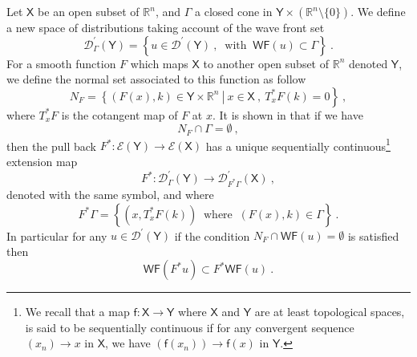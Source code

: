 \documentclass[11pt]{book}
\newcommand{\WF}{\mathsf{WF}}
\newcommand{\Dcal}{\mathcal{D}}
\newcommand{\Ecal}{\mathcal{E}}
\newcommand{\Rbb}{\mathbb{R}}
\newcommand{\Xsf}{\mathsf{X}}
\newcommand{\Ysf}{\mathsf{Y}}
\newcommand{\fsf}{\mathsf{f}}
\theoremstyle{break}
\begin{document}
Let $\Xsf$ be an open subset of $\Rbb^n$, and $\Gamma$ a closed cone in $\Ysf \times\left(\Rbb^n\setminus\{0\}\right)$. We define a new space of distributions taking account of the wave front set
%
\begin{equation*}
\Dcal^\prime_\Gamma(\Ysf) = \left\{ u \in \Dcal^\prime(\Ysf) \ , \ \mbox{ with } \ \WF(u) \subset \Gamma \right\} \ . 
\end{equation*}
%
For a smooth function $F$ which maps $\Xsf$ to another open subset of $\Rbb^n$ denoted $\Ysf$, we define the normal set associated to this function as follow
%
\begin{equation*}
N_F = \left. \left\{ (F(x),k) \in \Ysf \times \Rbb^n \ \right| \ x \in \Xsf \ , \ T^\ast_xF(k) = 0 \right\} \ , 
\end{equation*}
%
where $T^\ast_xF$ is the cotangent map of $F$ at $x$. It is shown in \cite[theorem 8.2.4]{HORMANDER_1990} that if we have
%
\begin{equation}
N_F \cap \Gamma = \emptyset \ , 
\label{eq:cond_pullback_wf}
\end{equation}
%
then the pull back $F^\ast : \Ecal(\Ysf) \to \Ecal(\Xsf)$ has a unique sequentially continuous\footnote{We recall that a map $\fsf : \Xsf \to \Ysf$ where $\Xsf$ and $\Ysf$ are at least topological spaces, is said to be sequentially continuous if for any convergent sequence $(x_n) \to x$ in $\Xsf$, we have $(\fsf(x_n)) \to \fsf(x)$ in $\Ysf$.} extension map 
%
\begin{equation*}
F^\ast : \Dcal^\prime_\Gamma(\Ysf) \to \Dcal^\prime_{F^\ast\Gamma}(\Xsf) \ , 
\end{equation*}
%
denoted with the same symbol, and where
%
\begin{equation*}
F^\ast\Gamma = \left\{ \left(x , T^\ast_xF(k)\right) \ \mbox{ where } \ (F(x),k) \in \Gamma \right\} \ .
\end{equation*}
%
In particular for any $u \in \Dcal^\prime(\Ysf)$ if the condition $N_F \cap \WF(u) = \emptyset$ is satisfied then
%
\begin{equation*}
\WF(F^\ast u) \subset F^\ast \WF(u) \ .
\end{equation*}
\end{document}

